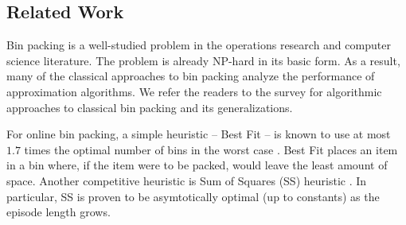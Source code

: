 \documentclass[letterpaper]{article} %
\begin{document}
\subsection{Related Work}
Bin packing is a well-studied problem in the operations research and computer science literature. 
The problem is already NP-hard in its basic form. As a result, many of the classical approaches to bin packing analyze the performance of approximation algorithms. We refer the readers to the survey \cite{Coffmanetal2013} for algorithmic approaches to classical bin packing and its generalizations.   

For online bin packing, a simple heuristic -- Best Fit -- is known to use at most $1.7$ times the optimal number of bins in the worst case \cite{Johnsonetal1974}. Best Fit places an item in a bin where, if the item were to be packed, would leave the least amount of space.
Another competitive heuristic is Sum of Squares (SS) heuristic \cite{csirik2006sum}. In particular, SS is proven to be asymtotically optimal (up to constants) as the episode length grows.
\end{document}
